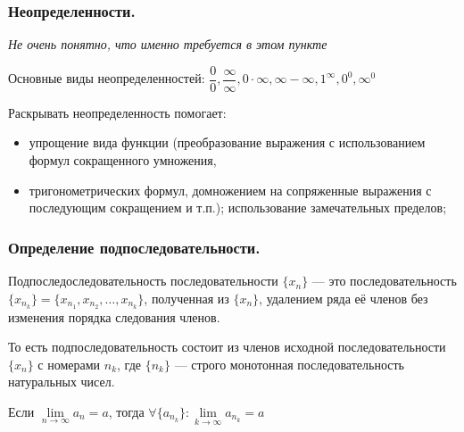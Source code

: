 \documentclass[12pt, a4paper]{article}
\begin{document}
	\subsubsection{Неопределенности.} 
	\emph{Не очень понятно, что именно требуется в этом пункте}
	
	Основные виды неопределенностей: $\dfrac{0}{0}, \dfrac{\infty}{\infty}, 0 \cdot \infty, \infty - \infty, 1^{\infty}, 0^0, \infty^0$

	Раскрывать неопределенность помогает:
	\begin{itemize}
		\item
		упрощение вида функции (преобразование выражения с использованием формул сокращенного умножения, 

		\item
		тригонометрических формул, домножением на сопряженные выражения с последующим сокращением и т.п.);
		использование замечательных пределов;
	\end{itemize}	

	\subsubsection{Определение подпоследовательности.} 
	Подпоследоследовательность последовательности $\{x_n\}$ --- это последовательность $\{x_{n_k}\} = \{x_{n_1}, x_{n_2}, \dots, x_{n_k}\}$, полученная из $\{x_n\}$, удалением ряда её членов без изменения порядка следования членов. 

	То есть подпоследовательность состоит из членов исходной последовательности $\{x_n\}$ с номерами $n_k$, где $\{n_k\}$ --- строго монотонная последовательность натуральных чисел. 

	\begin{remark}
		Если $\lim\limits_{n \to \infty} a_n = a$, тогда $\forall \{a_{n_k}\}: \lim\limits_{k \to \infty} a_{n_k} = a$
	\end{remark}
\end{document}
